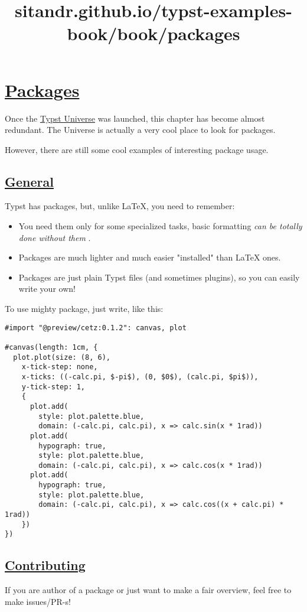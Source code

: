 \title{sitandr.github.io/typst-examples-book/book/packages}

\section{\texorpdfstring{\hyperref[packages]{Packages}}{Packages}}\label{packages}

Once the \href{https://typst.app/universe}{Typst Universe} was launched,
this chapter has become almost redundant. The Universe is actually a
very cool place to look for packages.

However, there are still some cool examples of interesting package
usage.

\subsection{\texorpdfstring{\hyperref[general]{General}}{General}}\label{general}

Typst has packages, but, unlike LaTeX, you need to remember:

\begin{itemize}
\tightlist
\item
  You need them only for some specialized tasks, basic formatting
  \emph{can be totally done without them} .
\item
  Packages are much lighter and much easier "installed" than LaTeX ones.
\item
  Packages are just plain Typst files (and sometimes plugins), so you
  can easily write your own!
\end{itemize}

To use mighty package, just write, like this:

\begin{verbatim}
#import "@preview/cetz:0.1.2": canvas, plot

#canvas(length: 1cm, {
  plot.plot(size: (8, 6),
    x-tick-step: none,
    x-ticks: ((-calc.pi, $-pi$), (0, $0$), (calc.pi, $pi$)),
    y-tick-step: 1,
    {
      plot.add(
        style: plot.palette.blue,
        domain: (-calc.pi, calc.pi), x => calc.sin(x * 1rad))
      plot.add(
        hypograph: true,
        style: plot.palette.blue,
        domain: (-calc.pi, calc.pi), x => calc.cos(x * 1rad))
      plot.add(
        hypograph: true,
        style: plot.palette.blue,
        domain: (-calc.pi, calc.pi), x => calc.cos((x + calc.pi) * 1rad))
    })
})
\end{verbatim}

\pandocbounded{}

\subsection{\texorpdfstring{\hyperref[contributing]{Contributing}}{Contributing}}\label{contributing}

If you are author of a package or just want to make a fair overview,
feel free to make issues/PR-s!
